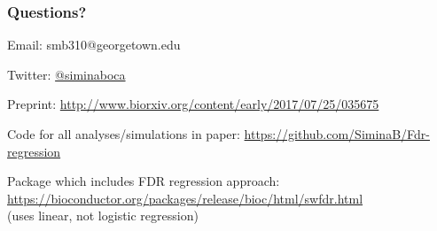 \documentclass{beamer}
\begin{document}

\begin{frame}
\frametitle{Questions?}

Email: smb310@georgetown.edu \\ \vspace{0.2cm}

Twitter: \href{https://twitter.com/siminaboca}{@siminaboca} \\ \vspace{0.2cm}

Preprint: \url{http://www.biorxiv.org/content/early/2017/07/25/035675} \\ \vspace{0.2cm}

Code for all analyses/simulations in paper: \url{https://github.com/SiminaB/Fdr-regression} \\ \vspace{0.2cm}

Package which includes FDR regression approach: \url{https://bioconductor.org/packages/release/bioc/html/swfdr.html}\\
(uses linear, not logistic regression)

\end{frame}
\end{document}
